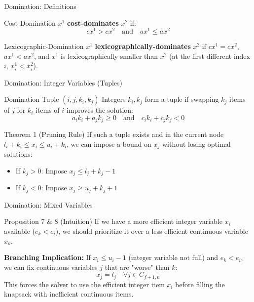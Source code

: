 \documentclass[aspectratio=169,xcolor=dvipsnames]{beamer}
\begin{document}
\begin{frame}{Domination: Definitions}
    \begin{block}{Cost-Domination}
        $x^1$ \textbf{cost-dominates} $x^2$ if:
        \[ cx^1 > cx^2 \quad \text{and} \quad ax^1 \leq ax^2 \]
    \end{block}

    \vspace{0.5cm}

    \begin{block}{Lexicographic-Domination}
        $x^1$ \textbf{lexicographically-dominates} $x^2$ if $cx^1 = cx^2$, $ax^1 < ax^2$, and $x^1$ is lexicographically smaller than $x^2$ (at the first different index $i$, $x^1_i < x^2_i$).
    \end{block}
\end{frame}

\begin{frame}{Domination: Integer Variables (Tuples)}
    \small
    \begin{block}{Domination Tuple $(i, j, k_i, k_j)$}
        Integers $k_i, k_j$ form a tuple if swapping $k_j$ items of $j$ for $k_i$ items of $i$ improves the solution:
        \[ a_i k_i + a_j k_j \geq 0 \quad \text{and} \quad c_i k_i + c_j k_j < 0 \]
    \end{block}

    \vspace{0.1cm}

    \begin{block}{Theorem 1 (Pruning Rule)}
        If such a tuple exists and in the current node $l_i + k_i \leq x_i \leq u_i + k_i$, we can impose a bound on $x_j$ without losing optimal solutions:
        \begin{itemize}
            \item If $k_j > 0$: Impose $x_j \leq l_j + k_j - 1$
            \item If $k_j < 0$: Impose $x_j \geq u_j + k_j + 1$
        \end{itemize}
    \end{block}
\end{frame}

\begin{frame}{Domination: Mixed Variables}
    \small
    \begin{block}{Proposition 7 \& 8 (Intuition)}
        If we have a more efficient integer variable $x_i$ available ($e_k < e_i$), we should prioritize it over a less efficient continuous variable $x_k$.
    \end{block}
    
    \vspace{0.3cm}
    
    \textbf{Branching Implication:}
    If $x_i \leq u_i - 1$ (integer variable not full) and $e_k < e_i$, we can fix continuous variables $j$ that are "worse" than $k$:
    \[ x_j = l_j \quad \forall j \in C_{f+1,n} \]
    This forces the solver to use the efficient integer item $x_i$ before filling the knapsack with inefficient continuous items.
\end{frame}
\end{document}
